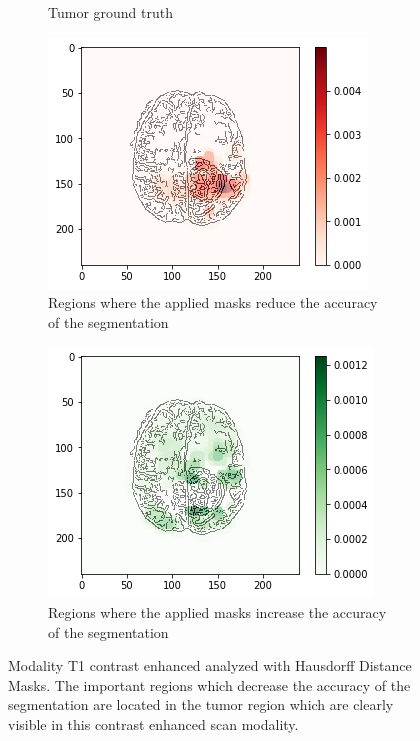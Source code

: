 \begin{figure}[H]
\begin{subfigure}[t]{.4\textwidth}
        \caption{Tumor ground truth}
    \end{subfigure}
    \begin{subfigure}[t]{.45\textwidth}
        \centering
        \includegraphics[width=\linewidth]{chapters/06_hdm/b_Brats18_TCIA08_242_1_L2/28.png}
        \caption{Regions where the applied masks reduce the accuracy of the segmentation}
    \end{subfigure}\hspace{1cm}%
    \begin{subfigure}[t]{.45\textwidth}
        \centering
        \includegraphics[width=\linewidth]{chapters/06_hdm/b_Brats18_TCIA08_242_1_L2/29.png}
        \caption{Regions where the applied masks increase the accuracy of the segmentation}
    \end{subfigure}
    \caption{Modality T1 contrast enhanced analyzed with Hausdorff Distance Masks. The important regions which decrease the accuracy of the segmentation are located in the tumor region which are clearly visible in this contrast enhanced scan modality.}
    \label{brats_tcia08_t1ce}
\end{figure}


